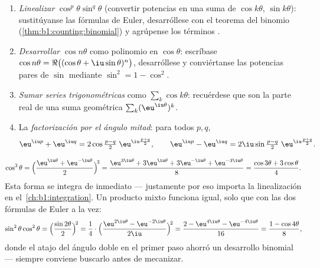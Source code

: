 \begin{method}\label{met:b1:complex:trig}
\begin{enumerate}
  \item \emph{Linealizar} $\cos^p\theta \sin^q\theta$ (convertir
        potencias en una suma de $\cos k\theta$, $\sin k\theta$):
        sustitúyanse las fórmulas de Euler, desarróllese con el teorema
        del binomio (\cref{thm:b1:counting:binomial}) y agrúpense los
        términos .
  \item \emph{Desarrollar} $\cos n\theta$ como polinomio en
        $\cos\theta$: escríbase $\cos n\theta = \Re\bigl((\cos\theta +
        \iu\sin\theta)^n\bigr)$, desarróllese y conviértanse las
        potencias pares de $\sin$ mediante $\sin^2 = 1 - \cos^2$.
  \item \emph{Sumar series trigonométricas} como $\sum_k \cos k\theta$:
        recuérdese que son la parte real de una suma geométrica
        $\sum_k (\eu^{\iu\theta})^k$.
  \item La \emph{factorización por el ángulo mitad}: para todos $p, q$,
        \[
        \eu^{\iu p} + \eu^{\iu q}
        = 2 \cos\tfrac{p - q}{2}\; \eu^{\iu \frac{p+q}{2}},
        \qquad
        \eu^{\iu p} - \eu^{\iu q}
        = 2\iu \sin\tfrac{p - q}{2}\; \eu^{\iu \frac{p+q}{2}} .
        \]
\end{enumerate}
\end{method}

\begin{example}[Linealización]\label{ex:b1:complex:linearize}
\[
\cos^3\theta
= \Bigl(\frac{\eu^{\iu\theta} + \eu^{-\iu\theta}}{2}\Bigr)^{\!3}
= \frac{\eu^{3\iu\theta} + 3\eu^{\iu\theta} + 3\eu^{-\iu\theta} +
\eu^{-3\iu\theta}}{8}
= \frac{\cos 3\theta + 3\cos\theta}{4}.
\]
Esta forma se integra de inmediato --- justamente por eso importa la
linealización en el~\cref{ch:b1:integration}. Un producto mixto
funciona igual, solo que con las dos fórmulas de Euler a la vez:
\[
\sin^2\theta\cos^2\theta
= \Bigl(\frac{\sin2\theta}2\Bigr)^{\!2}
= \frac{1}{4}\cdot
\Bigl(\frac{\eu^{2\iu\theta} - \eu^{-2\iu\theta}}{2\iu}
\Bigr)^{\!2}
= \frac{2 - \eu^{4\iu\theta} - \eu^{-4\iu\theta}}{16}
= \frac{1 - \cos4\theta}{8} ,
\]
donde el atajo del ángulo doble en el primer paso ahorró un desarrollo
binomial --- siempre conviene buscarlo antes de mecanizar.
\end{example}

